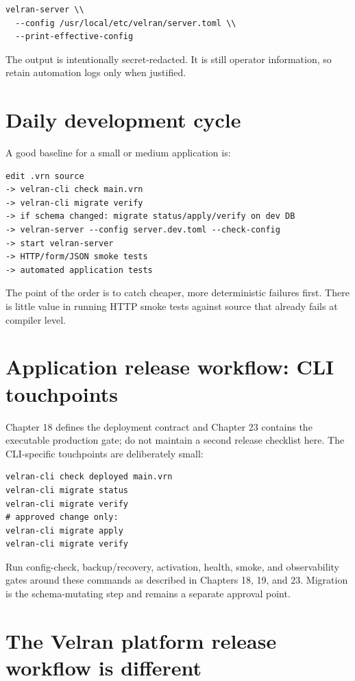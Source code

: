 \begin{lstlisting}
velran-server \\
  --config /usr/local/etc/velran/server.toml \\
  --print-effective-config
\end{lstlisting}

The output is intentionally secret-redacted. It is still operator information, so retain automation logs only when justified.

\section{Daily development cycle}

A good baseline for a small or medium application is:

\begin{lstlisting}
edit .vrn source
-> velran-cli check main.vrn
-> velran-cli migrate verify
-> if schema changed: migrate status/apply/verify on dev DB
-> velran-server --config server.dev.toml --check-config
-> start velran-server
-> HTTP/form/JSON smoke tests
-> automated application tests
\end{lstlisting}

The point of the order is to catch cheaper, more deterministic failures first. There is little value in running HTTP smoke tests against source that already fails at compiler level.

\section{Application release workflow: CLI touchpoints}

Chapter 18 defines the deployment contract and Chapter 23 contains the executable production gate; do not maintain a second release checklist here. The CLI-specific touchpoints are deliberately small:

\begin{lstlisting}
velran-cli check deployed main.vrn
velran-cli migrate status
velran-cli migrate verify
# approved change only:
velran-cli migrate apply
velran-cli migrate verify
\end{lstlisting}

Run config-check, backup/recovery, activation, health, smoke, and observability gates around these commands as described in Chapters 18, 19, and 23. Migration  is the schema-mutating step and remains a separate approval point.

\section{The Velran platform release workflow is different}

